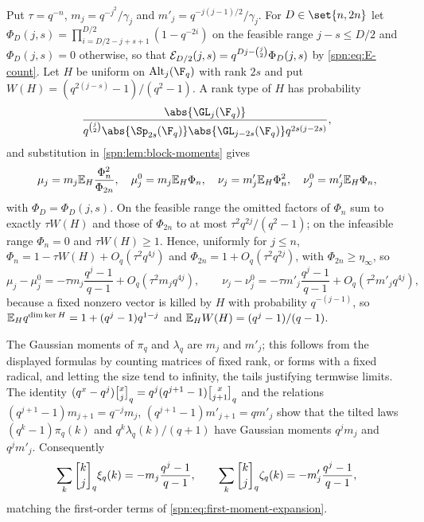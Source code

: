 Put $\tau=q^{-n}$, $m_j=q^{-j^2}/\gamma_j$ and $m'_j=q^{-j(j-1)/2}/\gamma_j$. For $D\in\set{n,2n}$
let $\Phi_D(j,s)=\prod_{i=D/2-j+s+1}^{D/2}(1-q^{-2i})$ on the feasible range $j-s\le D/2$ and
$\Phi_D(j,s)=0$ otherwise, so that $\mathcal{E}_{D/2}(j,s)=q^{Dj-\binom j2}\Phi_D(j,s)$ by
\eqref{spn:eq:E-count}. Let $H$ be uniform on $\spnAlt_j(\F_q)$ with rank $2s$ and put
$W(H)=(q^{2(j-s)}-1)/(q^2-1)$. A rank type of $H$ has probability
\[
 \frac{\abs{\GL_j(\F_q)}}{q^{\binom j2}\abs{\Sp_{2s}(\F_q)}\abs{\GL_{j-2s}(\F_q)}q^{2s(j-2s)}},
\]
and substitution in \cref{spn:lem:block-moments} gives
\begin{equation}\label{spn:eq:unified-moments}
 \mu_j=m_j\mathbb{E}_H\frac{\Phi_n^2}{\Phi_{2n}},\quad \mu_j^0=m_j\mathbb{E}_H\Phi_n,\quad
 \nu_j=m'_j\mathbb{E}_H\Phi_n^2,\quad \nu_j^0=m'_j\mathbb{E}_H\Phi_n,
\end{equation}
with $\Phi_D=\Phi_D(j,s)$. On the feasible range the omitted factors of $\Phi_n$ sum to exactly
$\tau W(H)$ and those of $\Phi_{2n}$ to at most $\tau^2q^{2j}/(q^2-1)$; on the infeasible range
$\Phi_n=0$ and $\tau W(H)\ge1$. Hence, uniformly for $j\le n$,
$\Phi_n=1-\tau W(H)+O_q(\tau^2q^{4j})$ and $\Phi_{2n}=1+O_q(\tau^2q^{2j})$, with
$\Phi_{2n}\ge\eta_\infty$, so
\begin{equation}\label{spn:eq:first-moment-expansion}
 \mu_j-\mu_j^0=-\tau m_j\frac{q^j-1}{q-1}+O_q(\tau^2m_jq^{4j}),\qquad
 \nu_j-\nu_j^0=-\tau m'_j\frac{q^j-1}{q-1}+O_q(\tau^2m'_jq^{4j}),
\end{equation}
because a fixed nonzero vector is killed by $H$ with probability $q^{-(j-1)}$, so
$\mathbb{E}_Hq^{\dim\ker H}=1+(q^j-1)q^{1-j}$ and $\mathbb{E}_HW(H)=(q^j-1)/(q-1)$.

The Gaussian moments of $\pi_q$ and $\lambda_q$ are $m_j$ and $m'_j$; this follows from the
displayed formulas by counting matrices of fixed rank, or forms with a fixed radical, and letting
the size tend to infinity, the tails justifying termwise limits. The identity
$(q^x-q^j)\spnqbin xjq=q^j(q^{j+1}-1)\spnqbin x{j+1}q$ and the relations
$(q^{j+1}-1)m_{j+1}=q^{-j}m_j$, $(q^{j+1}-1)m'_{j+1}=qm'_j$ show that the tilted laws
$(q^k-1)\pi_q(k)$ and $q^k\lambda_q(k)/(q+1)$ have Gaussian moments $q^jm_j$ and $q^jm'_j$.
Consequently
\begin{equation}\label{spn:eq:signed-moments}
 \sum_k\spnqbin kjq\xi_q(k)=-m_j\frac{q^j-1}{q-1},\qquad
 \sum_k\spnqbin kjq\zeta_q(k)=-m'_j\frac{q^j-1}{q-1},
\end{equation}
matching the first-order terms of \eqref{spn:eq:first-moment-expansion}.

